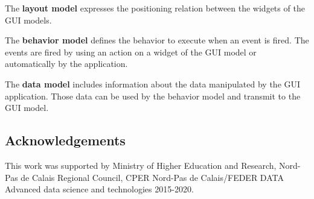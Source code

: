 \documentclass[conference]{IEEEtran}
\begin{document}
The \textbf{layout model} expresses the positioning relation between the widgets of the GUI models.

The \textbf{behavior model} defines the behavior to execute when
    an event is fired.
The events are fired by using an action on a widget of the GUI model or
    automatically by the application.

The \textbf{data model} includes information about the data manipulated
    by the GUI application.
Those data can be used by the behavior model and transmit to the
    GUI model.

\subsection*{Acknowledgements} 
This work was supported by Ministry of Higher Education and Research, Nord-Pas de Calais Regional Council, CPER Nord-Pas de Calais/FEDER DATA Advanced data science and technologies 2015-2020.

%

%
\end{document}
